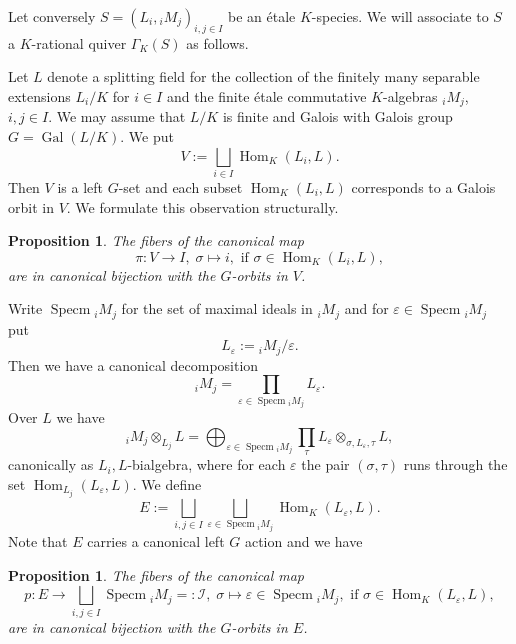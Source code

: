 \documentclass[a4paper,12pt,reqno]{amsart}
\DeclareMathOperator{\Specm}{\mathrm{Specm}}
\DeclareMathOperator{\Hom}{\mathrm{Hom}}
\DeclareMathOperator{\Gal}{\mathrm {Gal}}
\theoremstyle{plain}
\newtheorem{proposition}[theorem]{Proposition}
\theoremstyle{remark}
\begin{document}
  Let conversely $S=(L_i,{}_iM_j)_{i,j\in I}$ be an \'etale $K$-species. We will associate to $S$ a $K$-rational quiver $\Gamma_K(S)$ as follows.

  Let $L$ denote a splitting field for the collection of the finitely many separable extensions $L_i/K$ for $i\in I$ and the finite \'etale commutative $K$-algebras ${}_iM_j$, $i,j\in I$. We may assume that $L/K$ is finite and Galois with Galois group $G=\Gal(L/K)$. We put
  \[
  V := \bigsqcup_{i\in I}\Hom_K(L_i,L).
  \]
  Then $V$ is a left $G$-set and each subset $\Hom_{K}(L_i,L)$ corresponds to a Galois orbit in $V$. We formulate this observation structurally.

  \begin{proposition}\label{prop:Viorbits}
  The fibers of the canonical map
  \[
  \pi\colon V\to I,\;\sigma\mapsto i,\text{ if }\sigma\in\Hom_K(L_i,L),
  \]
  are in canonical bijection with the $G$-orbits in $V$.
  \end{proposition}

  Write $\Specm{}_iM_j$ for the set of maximal ideals in ${}_iM_j$ and for $\varepsilon\in\Specm{}_iM_j$ put
  \[
  L_{\varepsilon}:={}_iM_j/\varepsilon.
  \]
  Then we have a canonical decomposition
  \begin{equation}
    {}_iM_j=\prod_{\varepsilon\in\Specm{}_iM_j}L_\varepsilon.
  \end{equation}
  Over $L$ we have 
  \begin{equation}
    {}_iM_j\otimes_{L_j} L=\bigoplus_{\varepsilon\in\Specm{}_iM_j}
    \prod_{\tau}L_\varepsilon\otimes_{\sigma,L_{\varepsilon},\tau}L,
    \label{eq:etalebialgebradecomposition}
  \end{equation}
  canonically as $L_i,L$-bialgebra, where for each $\varepsilon$ the pair $(\sigma,\tau)$ runs through the set \(\Hom_{L_j}(L_{\varepsilon},L)\). We define
  \[
  E:=\bigsqcup_{i,j\in I}\bigsqcup_{\varepsilon\in\Specm{}_iM_j}\Hom_{K}(L_{\varepsilon},L).
  \]
  Note that $E$ carries a canonical left $G$ action and we have
  \begin{proposition}\label{prop:iMjorbits}
  The fibers of the canonical map
  \[
  p\colon E\to \bigsqcup_{i,j\in I}\Specm{}_iM_j=:\mathcal{I},\;
  \sigma\mapsto \varepsilon\in \Specm{}_iM_j,\text{ if }\sigma\in\Hom_{K}(L_{\varepsilon},L),
  \]
  are in canonical bijection with the $G$-orbits in $E$.
  \end{proposition}
  
\end{document}
